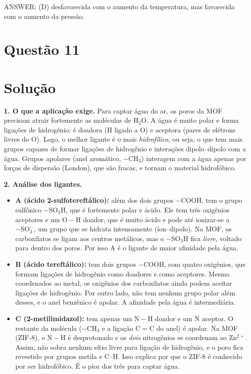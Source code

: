 \documentclass{article}%
\begin{document}
ANSWER: (D) desfavorecida com o aumento da temperatura, mas favorecida com o aumento da pressão.%
\newpage%
\section*{Questão 11}

\section*{Solução}

\textbf{1. O que a aplicação exige.} Para captar água do ar, os poros da MOF precisam atrair fortemente as moléculas de $\mathrm{H_2O}$. A água é muito polar e forma ligações de hidrogênio: é doadora (H ligado a O) e aceptora (pares de elétrons livres do O). Logo, o melhor ligante é o mais \emph{hidrofílico}, ou seja, o que tem mais grupos capazes de formar ligações de hidrogênio e interações dipolo--dipolo com a água. Grupos apolares (anel aromático, $-\mathrm{CH_3}$) interagem com a água apenas por forças de dispersão (London), que são fracas, e tornam o material hidrofóbico.

\textbf{2. Análise dos ligantes.}

\begin{itemize}
\item \textbf{A (ácido 2-sulfotereftálico):} além dos dois grupos $-\mathrm{COOH}$, tem o grupo sulfônico $-\mathrm{SO_3H}$, que é fortemente polar e ácido. Ele tem três oxigênios aceptores e um $\mathrm{O-H}$ doador, que é muito ácido e pode até ionizar-se a $-\mathrm{SO_3^-}$, um grupo que se hidrata intensamente (íon--dipolo). Na MOF, os carboxilatos se ligam aos centros metálicos, mas o $-\mathrm{SO_3H}$ fica \emph{livre}, voltado para dentro dos poros. Por isso A é o ligante de maior afinidade pela água.

\item \textbf{B (ácido tereftálico):} tem dois grupos $-\mathrm{COOH}$, com quatro oxigênios, que formam ligações de hidrogênio como doadores e como aceptores. Mesmo coordenados ao metal, os oxigênios dos carboxilatos ainda podem aceitar ligações de hidrogênio. Por outro lado, não tem nenhum grupo polar além desses, e o anel benzênico é apolar. A afinidade pela água é intermediária.

\item \textbf{C (2-metilimidazol):} tem apenas um $\mathrm{N-H}$ doador e um N aceptor. O restante da molécula ($-\mathrm{CH_3}$ e a ligação $\mathrm{C=C}$ do anel) é apolar. Na MOF (ZIF-8), o $\mathrm{N-H}$ é desprotonado e os \emph{dois} nitrogênios se coordenam ao $\mathrm{Zn^{2+}}$. Assim, não sobra nenhum sítio livre para ligação de hidrogênio, e o poro fica revestido por grupos metila e C--H. Isso explica por que o ZIF-8 é conhecido por ser hidrofóbico. É o pior dos três para captar água.
\end{itemize}
\end{document}
